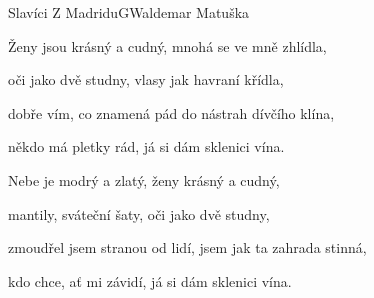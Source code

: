 \setcounter{page}{80}
\begin{song}{Slavíci Z Madridu}{G}{Waldemar Matuška}

       

\begin{SBVerse}





\end{SBVerse}

\begin{SBChorus}





\end{SBChorus}

\begin{SBVerse}

Ženy jsou krásný a cudný, mnohá se ve mně zhlídla,

oči jako dvě studny, vlasy jak havraní křídla,

dobře vím, co znamená pád do nástrah dívčího klína,

někdo má pletky rád, já si dám sklenici vína.

\end{SBVerse}

\begin{SBVerse}

Nebe je modrý a zlatý, ženy krásný a cudný,

mantily, sváteční šaty, oči jako dvě studny,

zmoudřel jsem stranou od lidí, jsem jak ta zahrada stinná,

kdo chce, ať mi závidí, já si dám sklenici vína.

\end{SBVerse}

\end{song}

\pagebreak

